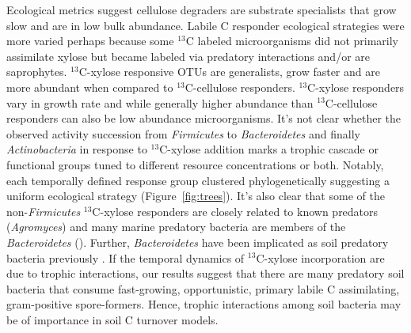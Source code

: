 Ecological metrics suggest cellulose degraders are substrate specialists that
grow slow and are in low bulk abundance. Labile C responder ecological
strategies were more varied perhaps because some $^{13}$C labeled
microorganisms did not primarily assimilate xylose but became labeled via
predatory interactions and/or are saprophytes. $^{13}$C-xylose responsive OTUs
are generalists, grow faster and are more abundant when compared to
$^{13}$C-cellulose responders. $^{13}$C-xylose responders vary in growth rate
and while generally higher abundance than $^{13}$C-cellulose responders can
also be low abundance microorganisms. It's not clear whether the observed
activity succession from \textit{Firmicutes} to \textit{Bacteroidetes} and
finally \textit{Actinobacteria} in response to $^{13}$C-xylose addition marks
a trophic cascade or functional groups tuned to different resource
concentrations or both. Notably, each temporally defined response group
clustered phylogenetically suggesting a uniform ecological strategy
(Figure~\ref{fig:trees}). It's also clear that some of the
non-\textit{Firmicutes} $^{13}$C-xylose responders are closely related to known
predators (\textit{Agromyces}) and many marine predatory bacteria are members
of the \textit{Bacteroidetes} (\citep{Banning2010a}). Further,
\textit{Bacteroidetes} have been implicated as soil predatory bacteria
previously \citep{Lueders2006}. If the temporal dynamics of
$^{13}$C-xylose incorporation are due to trophic interactions, our results
suggest that there are many predatory soil bacteria that consume
fast-growing, opportunistic, primary labile C assimilating, gram-positive
spore-formers. Hence, trophic interactions among soil bacteria may be of
importance in soil C turnover models.

